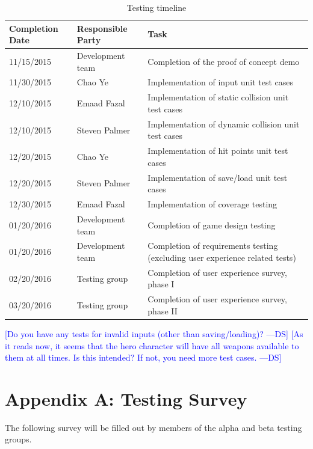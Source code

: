 \documentclass[12pt, titlepage]{article}
\newcommand{\authornote}[3]{\textcolor{#1}{[#3 ---#2]}}
\newcommand{\authornote}[3]{}
\newcommand{\ds}[1]{\authornote{blue}{DS}{#1}}
\begin{document}
\begin{table}[ht]
\caption{Testing timeline} \label{tab:timeline}
\begin{tabularx}{\textwidth}{p{2.5cm}p{3cm}X}
\toprule {\bf Completion Date} & {\bf Responsible Party} & {\bf Task}\\
\midrule
11/15/2015 & Development team & Completion of the proof of concept demo\\[0.3\baselineskip]
11/30/2015 & Chao Ye & Implementation of input unit test cases\\[0.3\baselineskip]
12/10/2015 & Emaad Fazal & Implementation of static collision unit test cases\\[0.3\baselineskip]
12/10/2015 & Steven Palmer & Implementation of dynamic collision unit test cases\\[0.3\baselineskip]
12/20/2015 & Chao Ye & Implementation of hit points unit test cases\\[0.3\baselineskip]
12/20/2015 & Steven Palmer & Implementation of save/load unit test cases\\[0.3\baselineskip]
12/30/2015 & Emaad Fazal & Implementation of coverage testing\\[0.3\baselineskip]
01/20/2016 & Development team & Completion of game design testing\\[0.3\baselineskip]
01/20/2016 & Development team & Completion of requirements testing (excluding user experience related tests)\\[0.3\baselineskip]
02/20/2016 & Testing group & Completion of user experience survey, phase I \\[0.3\baselineskip]
03/20/2016 & Testing group & Completion of user experience survey, phase II\\
\bottomrule
\end{tabularx}
\end{table}

\ds{Do you have any tests for invalid inputs (other than saving/loading)?}
\ds{As it reads now, it seems that the hero character will have all weapons available
to them at all times. Is this intended? If not, you need more test cases.}

\newpage
\section{Appendix A:  Testing Survey}
\label{sec:survey}

The following survey will be filled out by members of the alpha and beta testing groups.
\end{document}

